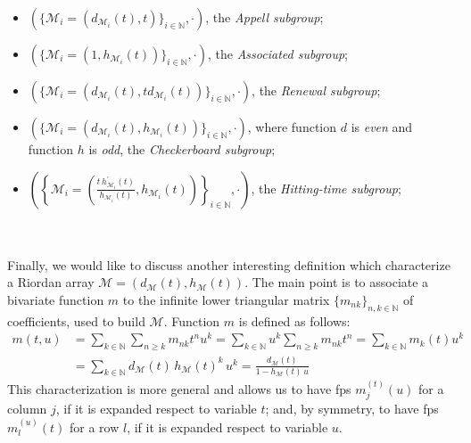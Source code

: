 \begin{itemize}
    \item $\left(\lbrace \mathcal{M}_{i}=(d_{\mathcal{M}_{i}}(t),t)
        \rbrace_{i\in\mathbb{N}},\cdot\right)$, the \emph{Appell subgroup};
    \item $\left(\lbrace \mathcal{M}_{i}=(1,h_{\mathcal{M}_{i}}(t))
        \rbrace_{i\in\mathbb{N}},\cdot\right)$, the \emph{Associated subgroup};
    \item $\left(\lbrace \mathcal{M}_{i}=(d_{\mathcal{M}_{i}}(t),td_{\mathcal{M}_{i}}(t))
        \rbrace_{i\in\mathbb{N}},\cdot\right)$, the \emph{Renewal subgroup};
    \item $\left(\lbrace \mathcal{M}_{i}=(d_{\mathcal{M}_{i}}(t),h_{\mathcal{M}_{i}}(t))
        \rbrace_{i\in\mathbb{N}},\cdot\right)$, where function $d$ is \emph{even} and 
        function $h$ is \emph{odd}, the \emph{Checkerboard subgroup};
    \item $\left(\left\lbrace \mathcal{M}_{i}=\left(\frac{t\,h_{\mathcal{M}_{i}}^{\prime}(t)}
            {h_{\mathcal{M}_{i}}(t)},h_{\mathcal{M}_{i}}(t)\right)
        \right\rbrace_{i\in\mathbb{N}},\cdot\right)$, the \emph{Hitting-time subgroup};
\end{itemize}
\quad
\\\\
Finally, 
we would like to discuss another interesting definition which characterize
a Riordan array $\mathcal{M}=(d_{\mathcal{M}}(t),h_{\mathcal{M}}(t))$. 
The main point is to associate a bivariate function $m$ 
to the infinite lower triangular matrix $\lbrace m_{nk}\rbrace_{n,k\in\mathbb{N}}$
of coefficients, used to build $\mathcal{M}$. Function $m$ is defined as follows:
\begin{displaymath}
    \begin{split}
        m(t,u) &= \sum_{k\in\mathbb{N}}{\sum_{n\geq k}{m_{nk} t^{n} u^{k}}}
            = \sum_{k\in\mathbb{N}}{u^{k}\sum_{n\geq k}{m_{nk} t^{n}}}
            = \sum_{k\in\mathbb{N}}{m_{k}(t)u^{k}}\\
            &= \sum_{k\in\mathbb{N}}{d_{\mathcal{M}}(t)\,h_{\mathcal{M}}(t)^{k}\,u^{k}}
            = \frac{d_{\mathcal{M}}(t)}{1-h_{\mathcal{M}}(t)\,u}
    \end{split}
\end{displaymath}
This characterization is more general and allows us to have \ac{fps}
$m_{j}^{(t)}(u)$ for a column $j$, if it is expanded respect to variable $t$;
and, by symmetry, to have \ac{fps} $m_{l}^{(u)}(t)$ for a row $l$, if it is
expanded respect to variable $u$.









